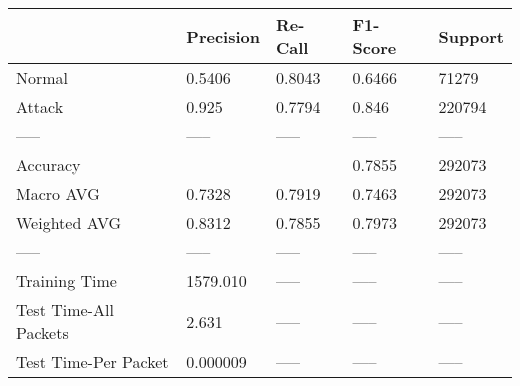 \begin{tabular}{lllll}
\toprule
{} & Precision & Re-Call & F1-Score & Support \\
\midrule
Normal                &    0.5406 &  0.8043 &   0.6466 &   71279 \\
Attack                &     0.925 &  0.7794 &    0.846 &  220794 \\
-----                 &     ----- &   ----- &    ----- &   ----- \\
Accuracy              &           &         &   0.7855 &  292073 \\
Macro AVG             &    0.7328 &  0.7919 &   0.7463 &  292073 \\
Weighted AVG          &    0.8312 &  0.7855 &   0.7973 &  292073 \\
-----                 &     ----- &   ----- &    ----- &   ----- \\
Training Time         &  1579.010 &   ----- &    ----- &   ----- \\
Test Time-All Packets &     2.631 &   ----- &    ----- &   ----- \\
Test Time-Per Packet  &  0.000009 &   ----- &    ----- &   ----- \\
\bottomrule
\end{tabular}

